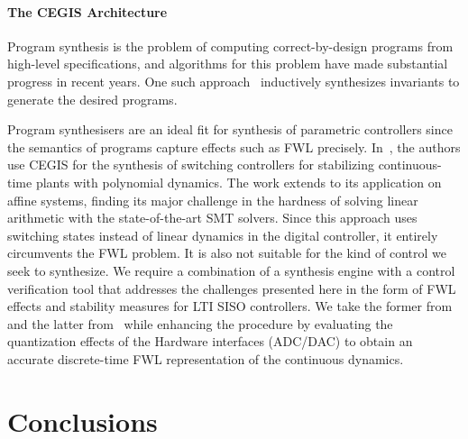 \documentclass[final]{sig-alternate-05-2015}
\begin{document}
\paragraph{The CEGIS Architecture}

Program synthesis is the problem of computing correct-by-design programs
from high-level specifications, and algorithms for this problem have made
substantial progress in recent years.  One such
approach~\cite{itzhaky2010simple} inductively synthesizes invariants to
generate the desired programs.

Program synthesisers are an ideal fit for synthesis of parametric
controllers since the semantics of programs capture effects such as FWL
precisely.  In~\cite{DBLP:conf/cdc/RavanbakhshS15}, the authors use CEGIS
for the synthesis of switching controllers for stabilizing continuous-time
plants with polynomial dynamics.  The work extends to its application on
affine systems, finding its major challenge in the hardness of solving
linear arithmetic with the state-of-the-art SMT solvers.  Since this
approach uses switching states instead of linear dynamics in the digital
controller, it entirely circumvents the FWL problem.  It is also not
suitable for the kind of control we seek to synthesize.  We require a
combination of a synthesis engine with a control verification tool that
addresses the challenges presented here in the form of FWL effects and
stability measures for LTI SISO controllers.  We take the former
from~\cite{DBLP:conf/lpar/DavidKL15} and the latter from~\cite{daes20161}
while enhancing the procedure by evaluating the quantization effects of the
Hardware interfaces (ADC/DAC) to obtain an accurate discrete-time FWL
representation of the continuous dynamics.
 

\section{Conclusions}\label{sec:conclusions}
\end{document}
